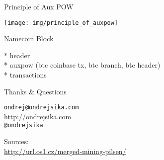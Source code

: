 \documentclass{beamer}
\begin{document}
\begin{frame}

    {\Huge Principle of Aux POW}\\

\end{frame}

\begin{frame}

    \texttt{[image: img/principle\_of\_auxpow]}

\end{frame}

\begin{frame}

    {\Huge Namecoin Block}\\

    \vspace{5mm}

    * header\\
    * auxpow (btc coinbase tx, btc branch, btc header)\\
    * transactions\\



\end{frame}


\begin{frame}

    {\LARGE Thanks \& Questions}\\

    \vspace{1cm}

    \texttt{ondrej@ondrejsika.com}\\
    \url{http://ondrejsika.com}\\
    \texttt{@ondrejsika}\\

    \vspace{1cm}

    Sources:\\
    \url{http://url.os1.cz/merged-mining-pilsen/}
\end{frame}
\end{document}
